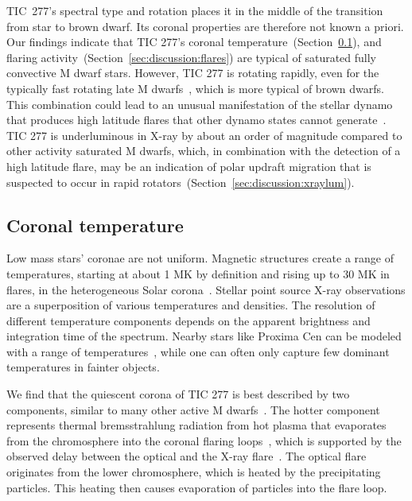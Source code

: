 \documentclass[twocolumn]{aastex631}
\begin{document}
TIC~277's spectral type and rotation places it in the middle of the transition from star to brown dwarf. Its coronal properties are therefore not known a priori. Our findings indicate that TIC 277's coronal temperature~(Section~\ref{sec:discussion:xraytemp}), and flaring activity~(Section~\ref{sec:discussion:flares}) are typical of saturated fully convective M dwarf stars. However, TIC 277 is rotating rapidly, even for the typically fast rotating late M dwarfs~\citep{medina2022galactic}, which is more typical of brown dwarfs. This combination could lead to an unusual manifestation of the stellar dynamo that produces high latitude flares that other dynamo states cannot generate~\citep{weber2016modeling, weber2023understanding}. TIC 277 is underluminous in X-ray by about an order of magnitude compared to other activity saturated M dwarfs, which, in combination with the detection of a high latitude flare, may be an indication of polar updraft migration that is suspected to occur in rapid rotators~(Section~\ref{sec:discussion:xraylum}).


\subsection{Coronal temperature}
\label{sec:discussion:xraytemp}
Low mass stars' coronae are not uniform. Magnetic structures create a range of temperatures, starting at about 1 MK by definition and rising up to 30 MK in flares, in the heterogeneous Solar corona~\citep{vaiana1978recent}. Stellar point source X-ray observations are a superposition of various temperatures and densities. The resolution of different temperature components depends on the apparent brightness and integration time of the spectrum. Nearby stars like Proxima Cen can be modeled with a range of temperatures~\citep[e.g.,][]{gudel2004flares, drake2020pointing}, while one can often only capture few dominant temperatures in fainter objects.  

We find that the quiescent corona of TIC 277 is best described by two components, similar to many other active M dwarfs~\citep{wargelin2008xray, robrade2010quiescent, behr2023muscles, magaudda2022firsta}. The hotter component represents thermal bremsstrahlung radiation from hot plasma that evaporates from the chromosphere into the coronal flaring loops~\citep{benz2016flare}, which is supported by the observed delay between the optical and the X-ray flare~\citep[Fig.~\ref{fig:lightcurves}, ][]{hawley2003multiwavelength}. The optical flare originates from the lower chromosphere, which is heated by the precipitating particles. This heating then causes evaporation of particles into the flare loop. %
\end{document}

